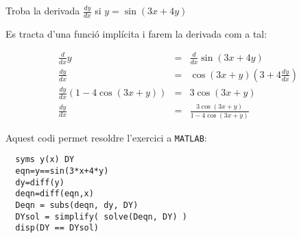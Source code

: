 \Exercise Troba la derivada $\frac{dy}{dx}$ si $y=\sin(3x+4y)$
\label{ex:derivada1}
\Answer


Es tracta d'una funció implícita i farem la derivada com a tal:

\begin{eqnarray*}
  \frac{d}{dx}y&=&\frac{d}{dx}\sin(3x+4y)\\
  \frac{dy}{dx}&=&\cos(3x+y)\left(3+4\frac{dy}{dx}\right)\\
  \frac{dy}{dx}\left(1-4\cos(3x+y)\right)&=&3\cos(3x+y)\\
  \frac{dy}{dx}&=&\frac{3\cos(3x+y)}{1-4\cos(3x+y)}
\end{eqnarray*}

Aquest codi permet resoldre l'exercici a \texttt{MATLAB}:
\begin{lstlisting}[style=Matlab-editor]
  % resolució exercici
  syms y(x) DY
  eqn=y==sin(3*x+4*y)
  dy=diff(y)
  deqn=diff(eqn,x)
  Deqn = subs(deqn, dy, DY)
  DYsol = simplify( solve(Deqn, DY) )
  disp(DY == DYsol)
  \end{lstlisting}

\blacksquare 